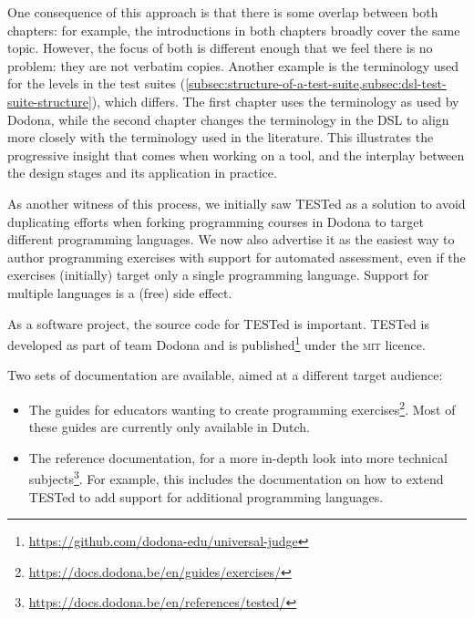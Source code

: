 \documentclass[./main]{subfiles}
\begin{document}
One consequence of this approach is that there is some overlap between both chapters: for example, the introductions in both chapters broadly cover the same topic.
However, the focus of both is different enough that we feel there is no problem: they are not verbatim copies.
Another example is the terminology used for the levels in the test suites (\cref{subsec:structure-of-a-test-suite,subsec:dsl-test-suite-structure}), which differs.
The first chapter uses the terminology as used by Dodona, while the second chapter changes the terminology in the DSL to align more closely with the terminology used in the literature.
This illustrates the progressive insight that comes when working on a tool, and the interplay between the design stages and its application in practice.

As another witness of this process, we initially saw TESTed as a solution to avoid duplicating efforts when forking programming courses in Dodona to target different programming languages.
We now also advertise it as the easiest way to author programming exercises with support for automated assessment, even if the exercises (initially) target only a single programming language.
Support for multiple languages is a (free) side effect.

As a software project, the source code for TESTed is important.
TESTed is developed as part of team Dodona and is published\footnote{\url{https://github.com/dodona-edu/universal-judge}} under the \textsc{mit} licence.

Two sets of documentation are available, aimed at a different target audience:

\begin{itemize}
    \item The guides for educators wanting to create programming exercises\footnote{\url{https://docs.dodona.be/en/guides/exercises/}}.
          Most of these guides are currently only available in Dutch.
    \item The reference documentation, for a more in-depth look into more technical subjects\footnote{\url{https://docs.dodona.be/en/references/tested/}}.
          For example, this includes the documentation on how to extend TESTed to add support for additional programming languages.
\end{itemize}
\end{document}
